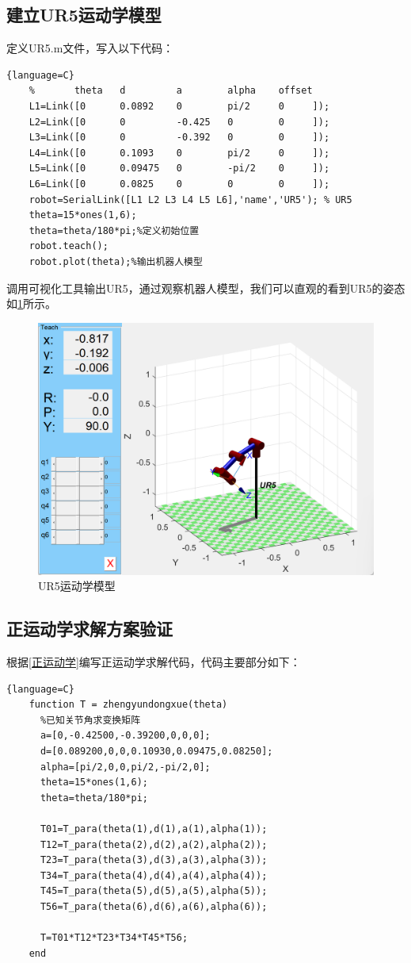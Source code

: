 \documentclass{seuthesis-2022}
\numberwithin{equation}{section}
\begin{document}
\subsection{建立UR5运动学模型}
定义UR5.m文件，写入以下代码：
\begin{lstlisting}{language=C}
    %       theta   d         a        alpha    offset
    L1=Link([0      0.0892    0        pi/2     0     ]); 
    L2=Link([0      0         -0.425   0        0     ]);
    L3=Link([0      0         -0.392   0        0     ]);
    L4=Link([0      0.1093    0        pi/2     0     ]);
    L5=Link([0      0.09475   0        -pi/2    0     ]);
    L6=Link([0      0.0825    0        0        0     ]);
    robot=SerialLink([L1 L2 L3 L4 L5 L6],'name','UR5'); % UR5
    theta=15*ones(1,6);
    theta=theta/180*pi;%定义初始位置
    robot.teach();
    robot.plot(theta);%输出机器人模型
\end{lstlisting}

调用可视化工具输出UR5，通过观察机器人模型，我们可以直观的看到UR5的姿态如\ref{fig:UR5 for Matlab}所示。
\begin{figure}[H]
  \centering
    \includegraphics[width=0.5\linewidth]{fig/UR5机械臂Matlab.png}
    \caption{UR5运动学模型}
    \label{fig:UR5 for Matlab}
\end{figure}

\subsection{正运动学求解方案验证}
根据\ref{正运动学}编写正运动学求解代码，代码主要部分如下：
\begin{lstlisting}{language=C}
    function T = zhengyundongxue(theta)
      %已知关节角求变换矩阵
      a=[0,-0.42500,-0.39200,0,0,0];
      d=[0.089200,0,0,0.10930,0.09475,0.08250];
      alpha=[pi/2,0,0,pi/2,-pi/2,0];
      theta=15*ones(1,6);
      theta=theta/180*pi;
    
      T01=T_para(theta(1),d(1),a(1),alpha(1));
      T12=T_para(theta(2),d(2),a(2),alpha(2));
      T23=T_para(theta(3),d(3),a(3),alpha(3));
      T34=T_para(theta(4),d(4),a(4),alpha(4));
      T45=T_para(theta(5),d(5),a(5),alpha(5));
      T56=T_para(theta(6),d(6),a(6),alpha(6));
      
      T=T01*T12*T23*T34*T45*T56;
    end
\end{lstlisting}
\end{document}
